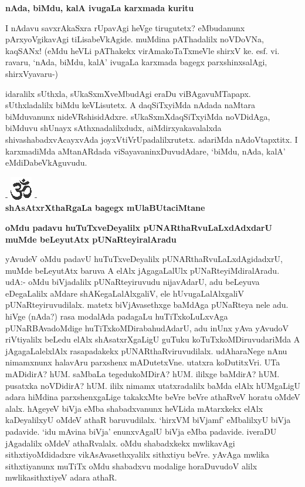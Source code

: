 {\bigskip
\noindent
{\large\bf nAda, biMdu, kalA ivugaLa karxmada kuritu}}\label{page177}
\medskip

\noindent
I nAdavu savxrAkaSxra rUpavAgi heVge tirugutetx? eMbudanunx pArxyoVgikavAgi tiLisabeVkAgide. muMdina pAThadalilx noVDoVNa, kaqSANx! (eMdu heVLi pAThakekx virAmakoTaTxmeVle shirxV ke. esf. vi. ravaru, `nAda, biMdu, kalA' ivugaLa karxmada bagegx parxshinxsalAgi, shirxVyavaru-)


idaralilx sUthxla, sUkaSxmXveMbudAgi eraDu viBAgavuMTapapx. sUthxladalilx biMdu keVLisutetx. A daqSiTxyiMda nAdada naMtara biMduvanunx nideVRshisidAdxre. sUkaSxmXdaqSiTxyiMda noVDidAga, biMduvu shUnayx sAthxnadalilxdudx, aiMdirxyakavalalxda shivashabadxvAcayxvAda joyxVtiVrUpadalilxrutetx. adariMda nAdoVtapxtitx. I karxmadiMda aMtanARdada viSayavaninxDuvudAdare, `biMdu, nAda, kalA' eMdiDabeVkAguvudu.


\bigskip

\begin{center}
- \includegraphics{om.eps} -\\[8pt]
{\bf\Large{shAsAtxrXthaRgaLa bagegx mUlaBUtaciMtane}}
\end{center}


{\medskip
\noindent
{\large\bf oMdu padavu huTuTxveDeyalilx pUNARthaRvuLaLxdAdxdarU muMde beLeyutAtx pUNaRteyiralAradu}}\label{page177a}
\medskip

\noindent
yAvudeV oMdu padavU huTuTxveDeyalilx pUNARthaRvuLaLxdAgidadxrU, muMde beLeyutAtx baruva A elAlx jAgagaLalUlx pUNaRteyiMdiralAradu. udA:- oMdu biVjadalilx pUNaRteyiruvudu nijavAdarU, adu beLeyuva eDegaLalilx aMdare shAKegaLalAlxgaliV, ele hUvugaLalAlxgaliV pUNaRteyiruvudilalx. matetx biVjAvasethxge baMdAga pUNaRteya nele adu. hiVge (nAda?) rasa modalAda padagaLu huTiTxkoLuLxvAga pUNaRBAvadoMdige huTiTxkoMDirabahudAdarU, adu inUnx yAva yAvudoV riVtiyalilx beLedu elAlx shAsatxrXgaLigU guTuku koTuTxkoMDiruvudariMda A jAgagaLalelxlAlx rasapadakekx pUNARthaRviruvudilalx. udAharaNege nAnu nimamxnunx halavAru parxshenx mADutetxVne. utatxra koDutitxVri. UTa mADidirA? hUM. saMbaLa tegedukoMDirA? hUM. ililxge baMdirA? hUM. pusatxka noVDidirA? hUM. ililx nimamx utatxradalilx baMda elAlx hUMgaLigU adara hiMdina parxshenxgaLige takakxMte beVre beVre athaRveV horatu oMdeV alalx. hAgeyeV biVja eMba shabadxvanunx heVLida mAtarxkekx elAlx kaDeyalilxyU oMdeV athaR baruvudilalx. `hirxVM biVjamf' eMbalilxyU biVja padavide. `idu mAvina biVja' enunxvAgalU biVja eMba padavide. iveraDU jAgadalilx oMdeV athaRvalalx. oMdu shabadxkekx mwlikavAgi sithxtiyoMdidadxre vikAsAvasethxyalilx sithxtiyu beVre. yAvAga mwlika sithxtiyanunx muTiTx oMdu shabadxvu modalige horaDuvudoV alilx mwlikasithxtiyeV adara athaR.

